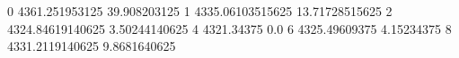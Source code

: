 0 4361.251953125 39.908203125
1 4335.06103515625 13.71728515625
2 4324.84619140625 3.50244140625
4 4321.34375 0.0
6 4325.49609375 4.15234375
8 4331.2119140625 9.8681640625
